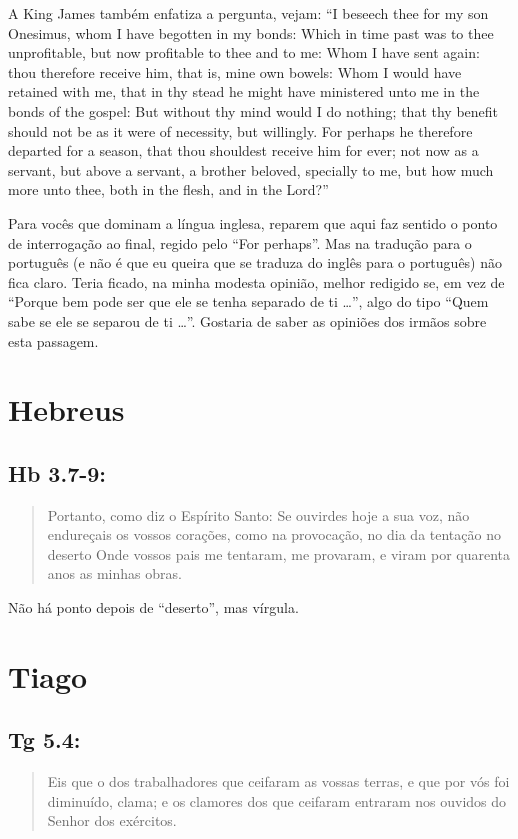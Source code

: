 A King James também enfatiza a pergunta, vejam: ``I beseech thee for my son Onesimus, whom I have begotten in my bonds: Which in time past was to thee unprofitable, but now profitable to thee and to me: Whom I have sent again: thou therefore receive him, that is, mine own bowels: Whom I would have retained with me, that in thy stead he might have ministered unto me in the bonds of the gospel: But without thy mind would I do nothing; that thy benefit should not be as it were of
necessity, but willingly. For perhaps he therefore departed for a season, that thou shouldest receive him for ever; not now as a servant, but above a servant, a brother beloved, specially to me, but how much more unto thee, both in the flesh, and in the Lord?''

Para vocês que dominam a língua inglesa, reparem que aqui faz sentido o ponto de interrogação ao final, regido pelo ``For perhaps''. Mas na tradução para o português (e não é que eu queira que se traduza do inglês para o português) não fica claro. Teria ficado, na minha modesta opinião, melhor redigido se, em vez de ``Porque bem pode ser que ele se tenha separado de ti \ldots{}'', algo do tipo ``Quem sabe se ele se separou de ti \ldots{}''. Gostaria de saber as opiniões dos irmãos sobre esta passagem.

\section{Hebreus}
\subsection*{Hb 3.7-9:}
\begin{quote}
    \small
Portanto, como diz o Espírito Santo: Se ouvirdes hoje a sua voz, não endureçais os vossos corações, como na provocação, no dia da tentação no deserto Onde vossos pais me tentaram, me provaram, e viram por quarenta anos as minhas obras.
\end{quote}

Não há ponto depois de ``deserto'', mas vírgula.

\section{Tiago}
\subsection*{Tg 5.4:}
\begin{quote}
    \small
Eis que o  dos trabalhadores que ceifaram as vossas terras, e que por vós foi diminuído, clama; e os clamores dos que ceifaram entraram nos ouvidos do Senhor dos exércitos.
\end{quote}

